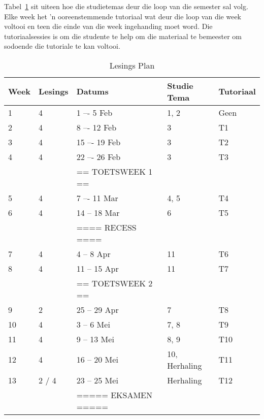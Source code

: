         Tabel~\ref{tab:lec_plan} sit uiteen hoe die studietemas deur die loop
        van die semester sal volg.  Elke week het 'n ooreenstemmende tutoriaal
        wat deur die loop van die week voltooi en teen die	einde van die week
        ingehanding moet word. Die tutoriaalsessies is om die studente te help
        om die materiaal te bemeester om sodoende die tutoriale te kan voltooi.

        \begin{table}[!h]
            \begin{center}
             \begin{tabular}{|l|l|l|l|l|}
                 \hline
                 {\bf Week} & {\bf Lesings} & {\bf Datums} & {\bf Studie Tema}
                 & {\bf Tutoriaal} \\
                 \hline
                 1  & 4     &  1 –-  5 Feb      & 1, 2  & Geen \\
                 2  & 4     &  8 –- 12 Feb      & 3     & T1 \\
                 3  & 4     & 15 –- 19 Feb      & 3     & T2 \\
                 4  & 4     & 22 –- 26 Feb      & 3     & T3 \\
                    &       & == TOETSWEEK 1 == &       & \\
                 5  & 4     &  7 –- 11 Mar      & 4, 5  & T4 \\
                 6  & 4     & 14 -- 18 Mar      & 6     & T5 \\
                    &       & ==== RECESS ====  &       & \\
                 7  & 4     &  4 --  8 Apr      & 11    & T6 \\
                 8  & 4     & 11 -- 15 Apr      & 11    & T7 \\
                    &       & == TOETSWEEK 2 == &       & \\
                 9  & 2     & 25 -- 29 Apr      & 7     & T8 \\
                 10 & 4     &  3 --  6 Mei      & 7, 8  & T9 \\
                 11 & 4     &  9 -- 13 Mei      & 8, 9  & T10 \\
                 12 & 4     & 16 -- 20 Mei      & 10, Herhaling & T11 \\
                 13 & 2 / 4 & 23 -- 25 Mei      & Herhaling & T12 \\
                    &       & ===== EKSAMEN ===== &       & \\
                 \hline
             \end{tabular}
             \caption{Lesings Plan} \label{tab:lec_plan}
            \end{center}
        \end{table}


